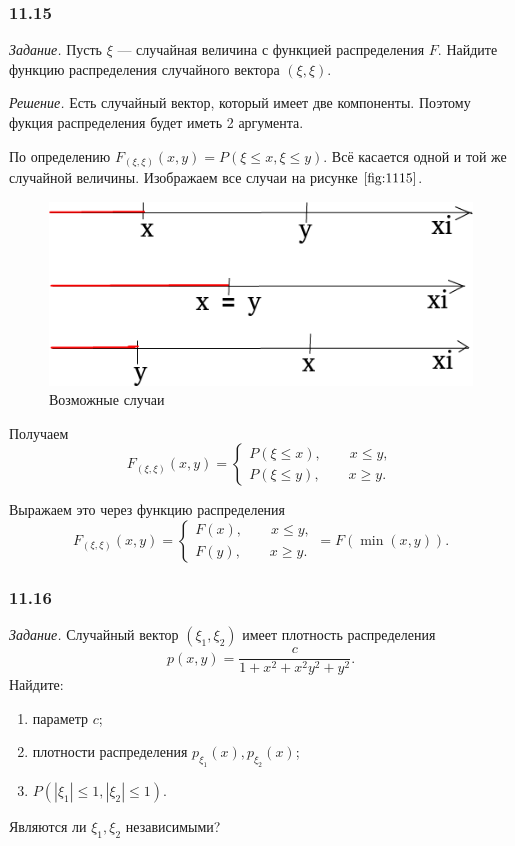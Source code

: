 \subsubsection*{11.15}

\textit{Задание.} Пусть $ \xi $ --- случайная величина с функцией распределения $F$.
Найдите функцию распределения случайного вектора $ \left( \xi, \xi \right) $.

\textit{Решение.} Есть случайный вектор, который имеет две компоненты.
Поэтому фукция распределения будет иметь 2 аргумента.

По определению $F_{ \left( \xi, \xi \right) } \left( x, y \right) = P \left( \xi \leq x, \xi \leq y \right) $.
Всё касается одной и той же случайной величины.
Изображаем все случаи на рисунке $ \ref{fig:1115}$.

\begin{figure}[h!]
  \centering
  \includegraphics[width=.8\textwidth]{./pictures/11_15.png}
  \caption{Возможные случаи}
  \label{fig:1115}
\end{figure}

Получаем
$$F_{ \left( \xi, \xi \right) } \left( x, y \right) =
\begin{cases}
P \left( \xi \leq x \right), \qquad x \leq y, \\
P \left( \xi \leq y \right), \qquad x \geq y.
\end{cases}$$

Выражаем это через функцию распределения
$$F_{ \left( \xi, \xi \right) } \left( x, y \right) =
\begin{cases}
F \left( x \right), \qquad x \leq y, \\
F \left( y \right), \qquad x \geq y.
\end{cases} =
F \left( \min \left( x, y \right) \right).$$

\subsubsection*{11.16}

\textit{Задание.} Случайный вектор $ \left( \xi_1, \xi_2 \right) $ имеет плотность распределения
$$p \left( x, y \right) =
\frac{c}{1+x^2 + x^2 y^2 + y^2}.$$
Найдите:
\begin{enumerate}[label=\alph*)]
\item параметр $c$;
\item плотности распределения $p_{ \xi_1} \left( x \right), p_{ \xi_2} \left( x \right) $;
\item $P \left( \left| \xi_1 \right| \leq 1, \left| \xi_2 \right| \leq 1 \right).$
\end{enumerate}
Являются ли $ \xi_1, \xi_2$ независимыми?

